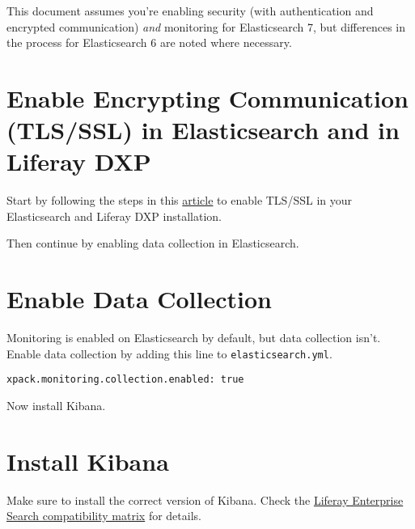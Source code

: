 This document assumes you're enabling security (with authentication and
encrypted communication) \emph{and} monitoring for Elasticsearch 7, but
differences in the process for Elasticsearch 6 are noted where
necessary.

\section{Enable Encrypting Communication (TLS/SSL) in Elasticsearch and
in Liferay
DXP}\label{enable-encrypting-communication-tlsssl-in-elasticsearch-and-in-liferay-dxp}

Start by following the steps in this
\href{/docs/7-2/deployment/-/knowledge_base/u/installing-liferay-enterprise-search-security}{article}
to enable TLS/SSL in your Elasticsearch and Liferay DXP installation.

Then continue by enabling data collection in Elasticsearch.

\section{Enable Data Collection}\label{enable-data-collection}

Monitoring is enabled on Elasticsearch by default, but data collection
isn't. Enable data collection by adding this line to
\texttt{elasticsearch.yml}.

\begin{verbatim}
xpack.monitoring.collection.enabled: true
\end{verbatim}

Now install Kibana.

\section{Install Kibana}\label{install-kibana}

Make sure to install the correct version of Kibana. Check the
\href{https://help.liferay.com/hc/en-us/articles/360016511651\#Liferay-Enterprise-Search}{Liferay
Enterprise Search compatibility matrix} for details.

